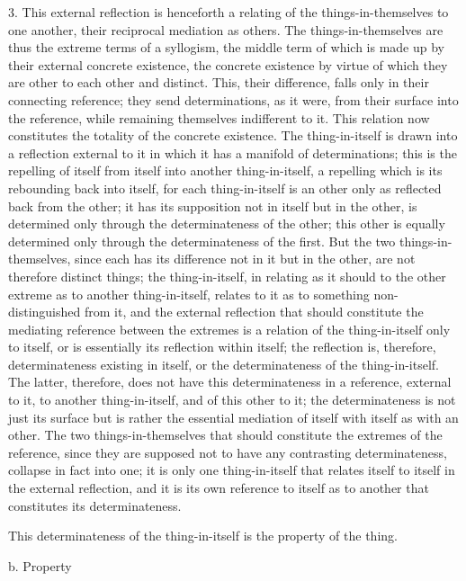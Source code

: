 3. This external reflection is henceforth a relating of
the things-in-themselves to one another, 
their reciprocal mediation as others.
The things-in-themselves are thus
the extreme terms of a syllogism,
the middle term of which is made up 
by their external concrete existence,
the concrete existence by virtue of which
they are other to each other and distinct.
This, their difference, falls only
in their connecting reference;
they send determinations, as it were,
from their surface into the reference,
while remaining themselves indifferent to it.
This relation now constitutes 
the totality of the concrete existence.
The thing-in-itself is drawn into a reflection external to it
in which it has a manifold of determinations;
this is the repelling of itself from itself 
into another thing-in-itself,
a repelling which is its rebounding back into itself,
for each thing-in-itself is an other 
only as reflected back from the other;
it has its supposition not in itself but in the other,
is determined only through the determinateness of the other;
this other is equally determined only
through the determinateness of the first.
But the two things-in-themselves,
since each has its difference
not in it but in the other,
are not therefore distinct things;
the thing-in-itself, in relating as it should to
the other extreme as to another thing-in-itself,
relates to it as to something non-distinguished from it,
and the external reflection that should constitute
the mediating reference between the extremes is a
relation of the thing-in-itself only to itself,
or is essentially its reflection within itself;
the reflection is, therefore, determinateness existing in itself,
or the determinateness of the thing-in-itself.
The latter, therefore, does not have this determinateness
in a reference, external to it,
to another thing-in-itself,
and of this other to it;
the determinateness is not just its surface
but is rather the essential mediation of
itself with itself as with an other.
The two things-in-themselves that should
constitute the extremes of the reference,
since they are supposed not
to have any contrasting determinateness,
collapse in fact into one;
it is only one thing-in-itself that
relates itself to itself in the external reflection,
and it is its own reference to itself as to another
that constitutes its determinateness.

This determinateness of the thing-in-itself is the property of the thing.

b. Property

